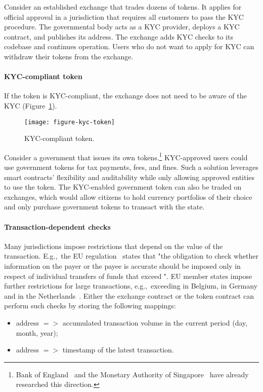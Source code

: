 Consider an established exchange that trades dozens of tokens.
It applies for official approval in a jurisdiction that requires all customers to pass the KYC procedure.
The governmental body acts as a KYC provider, deploys a KYC contract, and publishes its address.
The exchange adds KYC checks to its codebase and continues operation.
Users who do not want to apply for KYC can withdraw their tokens from the exchange.


\paragraph{KYC-compliant token}

If the token is KYC-compliant, the exchange does not need to be aware of the KYC (Figure~\ref{fig:KYCCompliantToken}).

\begin{figure}[h]
	\centering
	\texttt{[image: figure-kyc-token]}
	\caption{KYC-compliant token.}
	\label{fig:KYCCompliantToken}
\end{figure}

Consider a government that issues its own tokens.\footnote{Bank of England~\cite{Danezis2016} and the Monetary Authority of Singapore~\cite{Singapore17} have already researched this direction.}
KYC-approved users could use government tokens for tax payments, fees, and fines.
Such a solution leverages smart contracts' flexibility and auditability while only allowing approved entities to use the token.
The KYC-enabled government token can also be traded on exchanges, which would allow citizens to hold currency portfolios of their choice and only purchase government tokens to transact with the state.

\paragraph{Transaction-dependent checks}

Many jurisdictions impose restrictions that depend on the value of the transaction.
E.g.,~the EU regulation~\cite{EU847} states that "the obligation to check whether information on the payer or the payee is accurate should \textelp{} be imposed only in respect of individual transfers of funds that exceed ".
EU member states impose further restrictions for large transactions, e.g.,~exceeding  in Belgium,  in Germany and in the Netherlands~\cite{PWC2015}.
Either the exchange contract or the token contract can perform such checks by storing the following mappings:
\begin{itemize}
	\item address $=>$ accumulated transaction volume in the current period (day, month, year);
	\item address $=>$ timestamp of the latest transaction.
\end{itemize}



